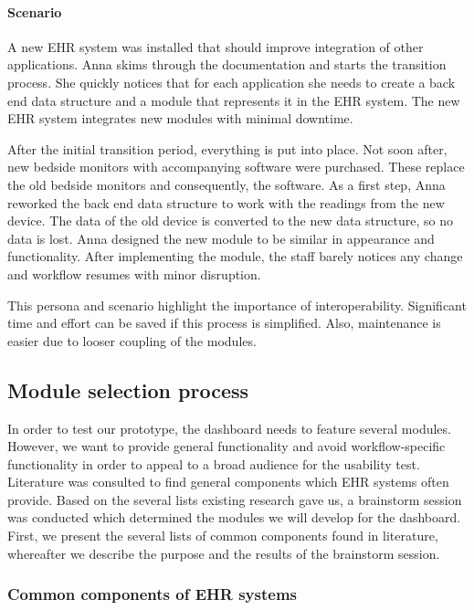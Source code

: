         \paragraph{Scenario} A new EHR system was installed that should improve integration of other applications. Anna skims through the documentation and starts the transition process. She quickly notices that for each application she needs to create a back end data structure and a module that represents it in the EHR system. The new EHR system integrates new modules with minimal downtime.

        After the initial transition period, everything is put into place. Not soon after, new bedside monitors with accompanying software were purchased. These replace the old bedside monitors and consequently, the software. As a first step, Anna reworked the back end data structure to work with the readings from the new device. The data of the old device is converted to the new data structure, so no data is lost. Anna designed the new module to be similar in appearance and functionality. After implementing the module, the staff barely notices any change and workflow resumes with minor disruption.\bigskip

        \noindent This persona and scenario highlight the importance of interoperability. Significant time and effort can be saved if this process is simplified. Also, maintenance is easier due to looser coupling of the modules.

    \subsection{Module selection process}\label{module_brainstorm}

    In order to test our prototype, the dashboard needs to feature several modules. However, we want to provide general functionality and avoid workflow-specific functionality in order to appeal to a broad audience for the usability test. Literature was consulted to find general components which EHR systems often provide. Based on the several lists existing research gave us, a brainstorm session was conducted which determined the modules we will develop for the dashboard. First, we present the several lists of common components found in literature, whereafter we describe the purpose and the results of the brainstorm session.

        \subsubsection{Common components of EHR systems}

